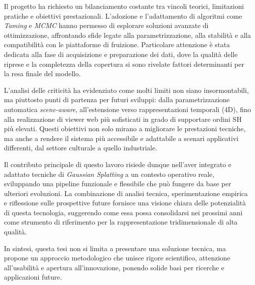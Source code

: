Il progetto ha richiesto un bilanciamento costante tra vincoli teorici, limitazioni pratiche e obiettivi prestazionali.  
L'adozione e l'adattamento di algoritmi come \emph{Taming} e \emph{MCMC} hanno permesso di esplorare soluzioni avanzate di ottimizzazione, affrontando sfide legate alla parametrizzazione, alla stabilità e alla compatibilità con le piattaforme di fruizione.  
Particolare attenzione è stata dedicata alla fase di acquisizione e preparazione dei dati, dove la qualità delle riprese e la completezza della copertura si sono rivelate fattori determinanti per la resa finale del modello.

L'analisi delle criticità ha evidenziato come molti limiti non siano insormontabili, ma piuttosto punti di partenza per futuri sviluppi: dalla parametrizzazione automatica \emph{scene-aware}, all'estensione verso rappresentazioni temporali (4D), fino alla realizzazione di viewer web più sofisticati in grado di supportare ordini SH più elevati.  
Questi obiettivi non solo mirano a migliorare le prestazioni tecniche, ma anche a rendere il sistema più accessibile e adattabile a scenari applicativi differenti, dal settore culturale a quello industriale.

Il contributo principale di questo lavoro risiede dunque nell'aver integrato e adattato tecniche di \emph{Gaussian Splatting} a un contesto operativo reale, sviluppando una pipeline funzionale e flessibile che può fungere da base per ulteriori evoluzioni.  
La combinazione di analisi tecnica, sperimentazione empirica e riflessione sulle prospettive future fornisce una visione chiara delle potenzialità di questa tecnologia, suggerendo come essa possa consolidarsi nei prossimi anni come strumento di riferimento per la rappresentazione tridimensionale di alta qualità.

In sintesi, questa tesi non si limita a presentare una soluzione tecnica, ma propone un approccio metodologico che unisce rigore scientifico, attenzione all'usabilità e apertura all'innovazione, ponendo solide basi per ricerche e applicazioni future.


